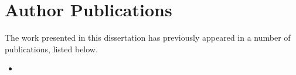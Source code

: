 


\newpage
\thispagestyle{plain}
\chapter*{Author Publications}

The work presented in this dissertation has previously appeared in a number of publications, listed below.

\begin{itemize}
  \item {}
\end{itemize}

\cleardoublepage
